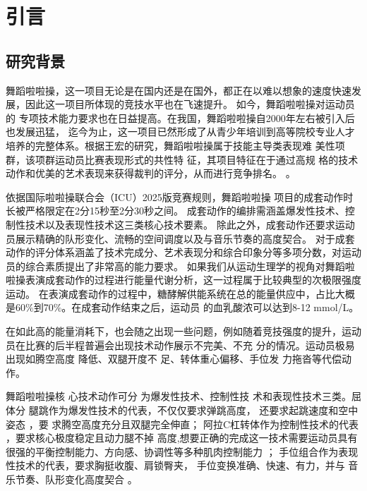 \documentclass[a4paper,12pt]{article}
\begin{document}
\cleardoublepage
{}
\setcounter{page}{1}

\section{引言}

\subsection{研究背景}
舞蹈啦啦操，这一项目无论是在国内还是在国外，都正在以难以想象的速度快速发展，因此这一项目所体现的竞技水平也在飞速提升。
如今，舞蹈啦啦操对运动员的 专项技术能力要求也在日益提高。在我国，舞蹈啦啦操自2000年左右被引入后也发展迅猛，
迄今为止，这一项目已然形成了从青少年培训到高等院校专业人才培养的完整体系。根据王宏的研究，舞蹈啦啦操属于技能主导类表现难
美性项群，该项群运动员比赛表现形式的共性特 征，其项目特征在于通过高规
格的技术动作和优美的艺术表现来获得裁判的评分，从而进行竞争排名。 \cite{wanghong2016}。

依据国际啦啦操联合会（ICU）2025版竞赛规则\cite{icu2025}，舞蹈啦啦操
项目的成套动作时长被严格限定在2分15秒至2分30秒之间。
成套动作的编排需涵盖爆发性技术、控制性技术以及表现性技术这三类核心技术要素。
除此之外，成套动作还要求运动员展示精确的队形变化、流畅的空间调度以及与音乐节奏的高度契合。
对于成套动作的评分体系涵盖了技术完成分、艺术表现分和综合印象分等多项分数，对运动员的综合素质提出了非常高的能力要求。
如果我们从运动生理学的视角对舞蹈啦啦操表演成套动作的过程进行能量代谢分析，这一过程属于比较典型的次极限强度运动。
在表演成套动作的过程中，糖酵解供能系统在总的能量供应中，占比大概是60\%到70\%。在成套动作结束之后，运动员
的血乳酸浓可以达到8-12 mmol/L。

在如此高的能量消耗下，也会随之出现一些问题，例如随着竞技强度的提升，运动员在比赛的后半程普遍会出现技术动作展示不完美、不充
分的情况。运动员极易出现如腾空高度
降低、双腿开度不
足、转体重心偏移、手位发
力拖沓等代偿动作。

舞蹈啦啦操核
心技术动作可分
为爆发性技术、控制性技
术和表现性技术三类。屈体分
腿跳作为爆发性技术的代表，不仅仅要求弹跳高度， 还要求起跳速度和空中姿态 \cite{wushengkou2010}，要
求腾空高度充分且双腿完全伸直；
阿拉C杠转体作为控制性技术的代表
，要求核心极度稳定且动力腿不掉
高度,想要正确的完成这一技术需要运动员具有很强的平衡控制能力、方向感、协调性等多种肌肉控制能力 \cite{shixingyu2023}；
手位组合作为表现性技术的代表，要求胸挺收腹、肩锁臀夹，
手位变换准确、快速、有力，并与
音乐节奏、队形变化高度契合 \cite{huangwei2017}。
\end{document}
